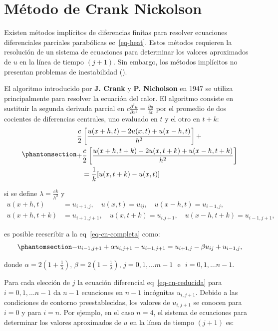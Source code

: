 \documentclass[
  spanish,
  us-letterpaper,
  DIV=11,
  numbers=noendperiod]{scrreprt}
\theoremstyle{definition}
\theoremstyle{plain}
\theoremstyle{remark}
\begin{document}
\chapter{Método de Crank Nickolson}\label{muxe9todo-de-crank-nickolson}

Existen métodos implícitos de diferencias finitas para resolver
ecuaciones diferenciales parciales parabólicas ec~\ref{eq-heat}. Estos
métodos requieren la resolución de un sistema de ecuaciones para
determinar los valores aproximados de \(u\) en la línea de tiempo
\((j + 1)\). Sin embargo, los métodos implícitos no presentan problemas
de inestabilidad ().

El algoritmo introducido por \textbf{J. Crank} y \textbf{P. Nicholson}
en 1947 se utiliza principalmente para resolver la ecuación del calor.
El algoritmo consiste en sustituir la segunda derivada parcial en
\(c\frac{\partial^2 u}{\partial x^2} = \frac{\partial u}{\partial t}\)
por el promedio de dos cocientes de diferencias centrales, uno evaluado
en \(t\) y el otro en \(t+k\):
\begin{equation}\phantomsection\label{eq-cn-completa}{
\begin{split}
\dfrac{c}{2}& \left[\dfrac{u(x+h,t)-2u(x,t)+u(x-h,t)}{h^2}\right] + \\
    + &\dfrac{c}{2} \left[\dfrac{u(x+h,t+k)-2u(x,t+k)+u(x-h,t+k)}{h^2} \right] \\
            &= \dfrac{1}{k}[u(x,t+k)-u(x,t)]
\end{split}
}\end{equation}

si se define \(\lambda = \frac{ck}{h^2}\) y \[
\begin{split}
u(x+h,t) &=u_{i+1,j}, \quad u(x,t)=u_{ij}, \quad u(x-h,t)=u_{i-1,j}, \\
u(x+h,t+k) &=u_{i+1,j+1}, \quad u(x,t+k)=u_{i.j+1}, \quad u(x-h,t+k)=u_{i-1,j+1},
\end{split}
\]

es posible reescribir a la eq~\ref{eq-cn-completa} como:
\begin{equation}\phantomsection\label{eq-cn-reducida}{
-u_{i-1,j+1} + \alpha u_{i,j+1} - u_{i+1,j+1} = u_{i+1,j} - \beta u_{ij} + u_{i-1,j},
}\end{equation}

donde \(\alpha=2(1+\frac{1}{\lambda})\),
\(\beta=2(1-\frac{1}{\lambda})\),
\(j=0,1,\dots m-1 \ \ \ \text{e} \ \ \ i=0,1,\dots n-1\).

Para cada elección de \(j\) la ecuación diferencial
eq~\ref{eq-cn-reducida} para \(i=0,1,\dots n-1\) da \(n-1\) ecuaciones
en \(n-1\) incógnitas \(u_{i,j+1}\). Debido a las condiciones de
contorno preestablecidas, los valores de \(u_{i, j+1}\) se conocen para
\(i=0\) y para \(i=n\). Por ejemplo, en el caso \(n=4\), el sistema de
ecuaciones para determinar los valores aproximados de \(u\) en la línea
de tiempo \((j+1)\) es:
\end{document}
